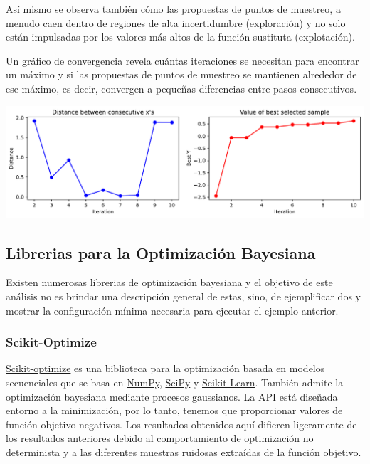 \documentclass[
  12pt,
  letterpaper,
  DIV=11,
  numbers=noendperiod]{scrartcl}
\begin{document}
Así mismo se observa también cómo las propuestas de puntos de muestreo,
a menudo caen dentro de regiones de alta incertidumbre (exploración) y
no solo están impulsadas por los valores más altos de la función
sustituta (explotación).

Un gráfico de convergencia revela cuántas iteraciones se necesitan para
encontrar un máximo y si las propuestas de puntos de muestreo se
mantienen alrededor de ese máximo, es decir, convergen a pequeñas
diferencias entre pasos consecutivos.

\includegraphics{ProyFinal_OptBayesiana_2024_y_files/figure-pdf/cell-7-output-1.pdf}

\subsection{Librerias para la Optimización
Bayesiana}\label{librerias-para-la-optimizaciuxf3n-bayesiana}

Existen numerosas librerias de optimización bayesiana y el objetivo de
este análisis no es brindar una descripción general de estas, sino, de
ejemplificar dos y mostrar la configuración mínima necesaria para
ejecutar el ejemplo anterior.

\subsubsection{Scikit-Optimize}\label{scikit-optimize}

\href{https://scikit-optimize.github.io/}{Scikit-optimize} es una
biblioteca para la optimización basada en modelos secuenciales que se
basa en \href{https://numpy.org/}{NumPy},
\href{https://scipy.org/}{SciPy} y
\href{http://scikit-learn.org/}{Scikit-Learn}. También admite la
optimización bayesiana mediante procesos gaussianos. La API está
diseñada entorno a la minimización, por lo tanto, tenemos que
proporcionar valores de función objetivo negativos. Los resultados
obtenidos aquí difieren ligeramente de los resultados anteriores debido
al comportamiento de optimización no determinista y a las diferentes
muestras ruidosas extraídas de la función objetivo.
\end{document}
